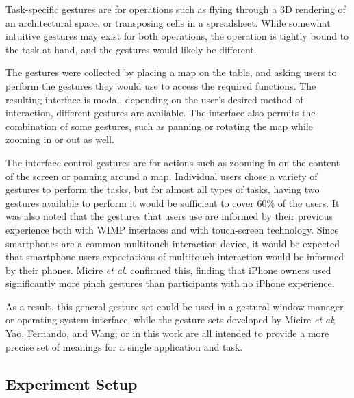 Task-specific gestures are for operations such as flying through a 3D rendering of an architectural space, or transposing cells in a spreadsheet. 
While somewhat intuitive gestures may exist for both operations, the operation is tightly bound to the task at hand, and the gestures would likely be different. 

The gestures were collected by placing a map on the table, and asking users to perform the gestures they would use to access the required functions. 
The resulting interface is modal, depending on the user's desired method of interaction, different gestures are available. 
The interface also permits the combination of some gestures, such as panning or rotating the map while zooming in or out as well. 

The interface control gestures are for actions such as zooming in on the content of the screen or panning around a map. 
Individual users chose a variety of gestures to perform the tasks, but for almost all types of tasks, having two gestures available to perform it would be sufficient to cover 60\% of the users. 
It was also noted that the gestures that users use are informed by their previous experience both with WIMP interfaces and with touch-screen technology. 
Since smartphones are a common multitouch interaction device, it would be expected that smartphone users expectations of multitouch interaction would be informed by their phones. 
Micire \textit{et al}. confirmed this, finding that iPhone owners used significantly more pinch gestures than participants with no iPhone experience. 
 
As a result, this general gesture set could be used in a gestural window manager or operating system interface, while the gesture sets developed by Micire \textit{et al}; Yao, Fernando, and Wang; or in this work are all intended to provide a more precise set of meanings for a single application and task. 

\subsection{Experiment Setup}



